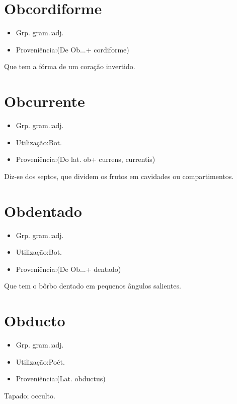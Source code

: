 \section{Obcordiforme}
\begin{itemize}
\item {Grp. gram.:adj.}
\end{itemize}
\begin{itemize}
\item {Proveniência:(De \textunderscore Ob...\textunderscore  + \textunderscore cordiforme\textunderscore )}
\end{itemize}
Que tem a fórma de um coração invertido.
\section{Obcurrente}
\begin{itemize}
\item {Grp. gram.:adj.}
\end{itemize}
\begin{itemize}
\item {Utilização:Bot.}
\end{itemize}
\begin{itemize}
\item {Proveniência:(Do lat. \textunderscore ob\textunderscore  + \textunderscore currens\textunderscore , \textunderscore currentis\textunderscore )}
\end{itemize}
Diz-se dos septos, que dividem os frutos em cavidades ou compartimentos.
\section{Obdentado}
\begin{itemize}
\item {Grp. gram.:adj.}
\end{itemize}
\begin{itemize}
\item {Utilização:Bot.}
\end{itemize}
\begin{itemize}
\item {Proveniência:(De \textunderscore Ob...\textunderscore  + \textunderscore dentado\textunderscore )}
\end{itemize}
Que tem o bôrbo dentado em pequenos ângulos salientes.
\section{Obducto}
\begin{itemize}
\item {Grp. gram.:adj.}
\end{itemize}
\begin{itemize}
\item {Utilização:Poét.}
\end{itemize}
\begin{itemize}
\item {Proveniência:(Lat. \textunderscore obductus\textunderscore )}
\end{itemize}
Tapado; occulto.
